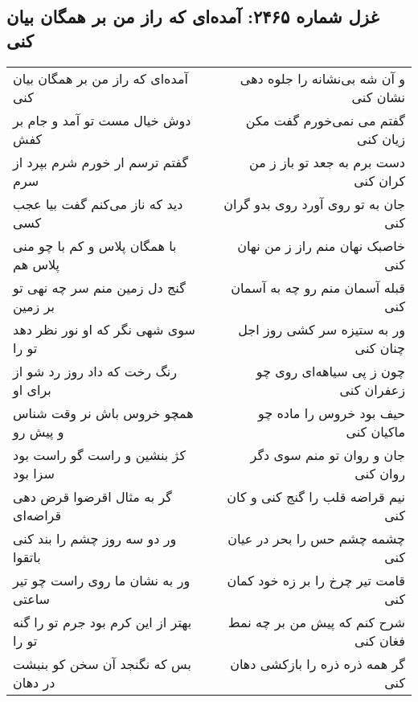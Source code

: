 \begin{center}
\section*{غزل شماره ۲۴۶۵: آمده‌ای که راز من بر همگان بیان کنی}
\label{sec:2465}
\begin{longtable}{l p{0.5cm} r}
آمده‌ای که راز من بر همگان بیان کنی
&&
و آن شه بی‌نشانه را جلوه دهی نشان کنی
\\
دوش خیال مست تو آمد و جام بر کفش
&&
گفتم می نمی‌خورم گفت مکن زیان کنی
\\
گفتم ترسم ار خورم شرم بپرد از سرم
&&
دست برم به جعد تو باز ز من کران کنی
\\
دید که ناز می‌کنم گفت بیا عجب کسی
&&
جان به تو روی آورد روی بدو گران کنی
\\
با همگان پلاس و کم با چو منی پلاس هم
&&
خاصبک نهان منم راز ز من نهان کنی
\\
گنج دل زمین منم سر چه نهی تو بر زمین
&&
قبله آسمان منم رو چه به آسمان کنی
\\
سوی شهی نگر که او نور نظر دهد تو را
&&
ور به ستیزه سر کشی روز اجل چنان کنی
\\
رنگ رخت که داد روز رد شو از برای او
&&
چون ز پی سیاهه‌ای روی چو زعفران کنی
\\
همچو خروس باش نر وقت شناس و پیش رو
&&
حیف بود خروس را ماده چو ماکیان کنی
\\
کژ بنشین و راست گو راست بود سزا بود
&&
جان و روان تو منم سوی دگر روان کنی
\\
گر به مثال اقرضوا قرض دهی قراضه‌ای
&&
نیم قراضه قلب را گنج کنی و کان کنی
\\
ور دو سه روز چشم را بند کنی باتقوا
&&
چشمه چشم حس را بحر در عیان کنی
\\
ور به نشان ما روی راست چو تیر ساعتی
&&
قامت تیر چرخ را بر زه خود کمان کنی
\\
بهتر از این کرم بود جرم تو را گنه تو را
&&
شرح کنم که پیش من بر چه نمط فغان کنی
\\
بس که نگنجد آن سخن کو بنبشت در دهان
&&
گر همه ذره ذره را بازکشی دهان کنی
\\
\end{longtable}
\end{center}
